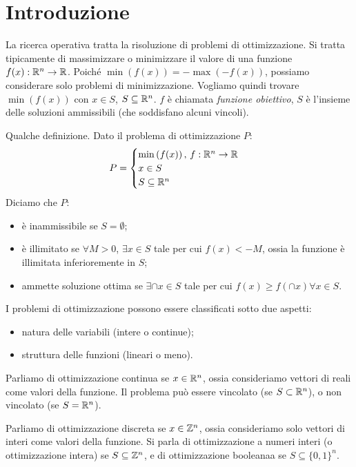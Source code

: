 
\section{Introduzione}

La ricerca operativa tratta la risoluzione di problemi di ottimizzazione.
Si tratta tipicamente di massimizzare o minimizzare il valore di una funzione $f(x) : \mathbb{R}^n \to \mathbb{R}$.
Poich\'e $\min \left( f(x) \right) = - \max \left( - f(x) \right)$, possiamo considerare solo problemi di minimizzazione.
Vogliamo quindi trovare $\min \left( f(x) \right)$ con $x \in S$, $S \subseteq \mathbb{R}^n$.
$f$ \`e chiamata \emph{funzione obiettivo}, $S$ \`e l'insieme delle soluzioni ammissibili (che soddisfano alcuni vincoli).

Qualche definizione.
Dato il problema di ottimizzazione $P$:
\[
	P =
	\begin{cases}
		\min \left( f(x) \right), \, f : \mathbb{R}^n \to \mathbb{R} \\
		x \in S \\
		S \subseteq \mathbb{R}^n
	\end{cases}
\]
Diciamo che $P$:
\begin{itemize}
	\item \`e inammissibile se $S = \emptyset$;
	\item \`e illimitato se $\forall M > 0$, $\exists x \in S$ tale per cui $f(x) < -M$, ossia la funzione \`e illimitata inferioremente in $S$;
	\item ammette soluzione ottima se $\exists \cap{x} \in S$ tale per cui $f(x) \ge f(\cap{x}) \forall x \in S$.
\end{itemize}

I problemi di ottimizzazione possono essere classificati sotto due aspetti:
\begin{itemize}
	\item natura delle variabili (intere o continue);
	\item struttura delle funzioni (lineari o meno).
\end{itemize}

Parliamo di ottimizzazione continua se $x \in \mathbb{R}^n$, ossia consideriamo vettori di reali come valori della funzione.
Il problema pu\`o essere vincolato (se $S \subset \mathbb{R}^n$), o non vincolato (se $S = \mathbb{R}^n$).

Parliamo di ottimizzazione discreta se $x \in \mathbb{Z}^n$, ossia consideriamo solo vettori di interi come valori della funzione.
Si parla di ottimizzazione a numeri interi (o ottimizzazione intera) se $S \subseteq \mathbb{Z}^n$, e di ottimizzazione booleanaa se $S \subseteq \{ 0, 1 \}^n$.

